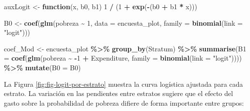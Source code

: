 \documentclass[
  spanish,
  12pt,
]{book}
\newenvironment{Shaded}{\begin{snugshade}}{\end{snugshade}}
\newcommand{\AttributeTok}[1]{\textcolor[rgb]{0.13,0.29,0.53}{#1}}
\newcommand{\ControlFlowTok}[1]{\textcolor[rgb]{0.13,0.29,0.53}{\textbf{#1}}}
\newcommand{\DecValTok}[1]{\textcolor[rgb]{0.00,0.00,0.81}{#1}}
\newcommand{\FunctionTok}[1]{\textcolor[rgb]{0.13,0.29,0.53}{\textbf{#1}}}
\newcommand{\NormalTok}[1]{#1}
\newcommand{\OtherTok}[1]{\textcolor[rgb]{0.56,0.35,0.01}{#1}}
\newcommand{\SpecialCharTok}[1]{\textcolor[rgb]{0.81,0.36,0.00}{\textbf{#1}}}
\newcommand{\StringTok}[1]{\textcolor[rgb]{0.31,0.60,0.02}{#1}}
\begin{document}
\begin{Shaded}
\begin{Highlighting}[]
\NormalTok{auxLogit }\OtherTok{\textless{}{-}} \ControlFlowTok{function}\NormalTok{(x, b0, b1) }\DecValTok{1} \SpecialCharTok{/}\NormalTok{ (}\DecValTok{1} \SpecialCharTok{+} \FunctionTok{exp}\NormalTok{(}\SpecialCharTok{{-}}\NormalTok{(b0 }\SpecialCharTok{+}\NormalTok{ b1 }\SpecialCharTok{*}\NormalTok{ x)))}

\NormalTok{B0 }\OtherTok{\textless{}{-}} \FunctionTok{coef}\NormalTok{(}\FunctionTok{glm}\NormalTok{(pobreza }\SpecialCharTok{\textasciitilde{}} \DecValTok{1}\NormalTok{, }\AttributeTok{data =}\NormalTok{ encuesta\_plot,}
               \AttributeTok{family =} \FunctionTok{binomial}\NormalTok{(}\AttributeTok{link =} \StringTok{"logit"}\NormalTok{)))}

\NormalTok{coef\_Mod }\OtherTok{\textless{}{-}}\NormalTok{ encuesta\_plot }\SpecialCharTok{\%\textgreater{}\%}
  \FunctionTok{group\_by}\NormalTok{(Stratum) }\SpecialCharTok{\%\textgreater{}\%}
  \FunctionTok{summarise}\NormalTok{(}\AttributeTok{B1 =} \FunctionTok{coef}\NormalTok{(}\FunctionTok{glm}\NormalTok{(pobreza }\SpecialCharTok{\textasciitilde{}} \SpecialCharTok{{-}}\DecValTok{1} \SpecialCharTok{+}\NormalTok{ Expenditure,}
                          \AttributeTok{family =} \FunctionTok{binomial}\NormalTok{(}\AttributeTok{link =} \StringTok{"logit"}\NormalTok{)))) }\SpecialCharTok{\%\textgreater{}\%}
  \FunctionTok{mutate}\NormalTok{(}\AttributeTok{B0 =}\NormalTok{ B0)}
\end{Highlighting}
\end{Shaded}

La Figura \ref{fig:fig-logit-por-estrato} muestra la curva logística ajustada para cada estrato. La variación en las pendientes entre estratos sugiere que el efecto del gasto sobre la probabilidad de pobreza difiere de forma importante entre grupos:
\end{document}
